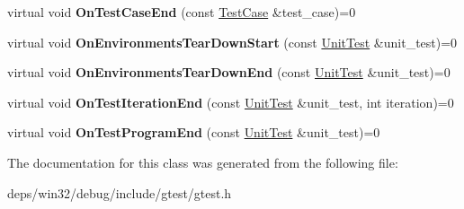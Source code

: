 \begin{DoxyCompactItemize}
\item 
\hypertarget{classtesting_1_1_test_event_listener_ae61985e2ef76ac78379b077be57a9c36}{}virtual void {\bfseries On\+Test\+Case\+End} (const \hyperlink{classtesting_1_1_test_case}{Test\+Case} \&test\+\_\+case)=0\label{classtesting_1_1_test_event_listener_ae61985e2ef76ac78379b077be57a9c36}

\item 
\hypertarget{classtesting_1_1_test_event_listener_a468b5e6701bcb86cb2c956caadbba5e4}{}virtual void {\bfseries On\+Environments\+Tear\+Down\+Start} (const \hyperlink{classtesting_1_1_unit_test}{Unit\+Test} \&unit\+\_\+test)=0\label{classtesting_1_1_test_event_listener_a468b5e6701bcb86cb2c956caadbba5e4}

\item 
\hypertarget{classtesting_1_1_test_event_listener_a9ea04fa7f447865ba76df35e12ba2092}{}virtual void {\bfseries On\+Environments\+Tear\+Down\+End} (const \hyperlink{classtesting_1_1_unit_test}{Unit\+Test} \&unit\+\_\+test)=0\label{classtesting_1_1_test_event_listener_a9ea04fa7f447865ba76df35e12ba2092}

\item 
\hypertarget{classtesting_1_1_test_event_listener_a550fdb3e55726e4cefa09f5697941425}{}virtual void {\bfseries On\+Test\+Iteration\+End} (const \hyperlink{classtesting_1_1_unit_test}{Unit\+Test} \&unit\+\_\+test, int iteration)=0\label{classtesting_1_1_test_event_listener_a550fdb3e55726e4cefa09f5697941425}

\item 
\hypertarget{classtesting_1_1_test_event_listener_ad15b6246d94c268e233487a86463ef3d}{}virtual void {\bfseries On\+Test\+Program\+End} (const \hyperlink{classtesting_1_1_unit_test}{Unit\+Test} \&unit\+\_\+test)=0\label{classtesting_1_1_test_event_listener_ad15b6246d94c268e233487a86463ef3d}

\end{DoxyCompactItemize}


The documentation for this class was generated from the following file\+:\begin{DoxyCompactItemize}
\item 
deps/win32/debug/include/gtest/gtest.\+h\end{DoxyCompactItemize}

